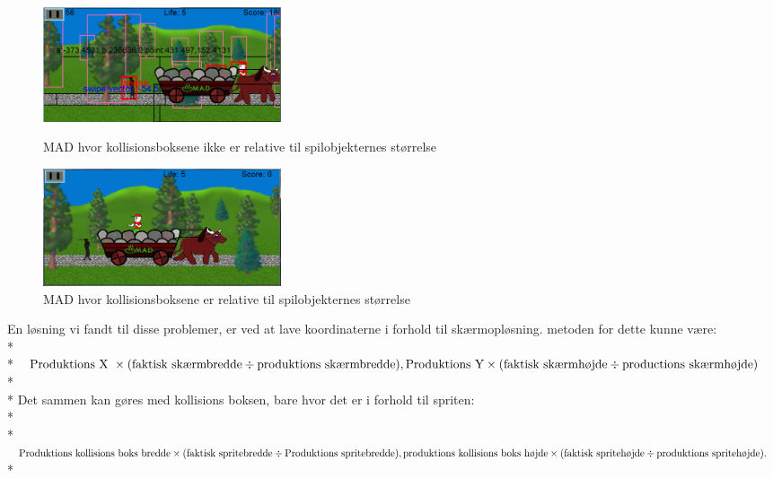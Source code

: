 \documentclass[Main.tex]{PositionOgSkalering}
\begin{document}
\begin{figure}[h]
\centering
\parbox{7cm}{   
\includegraphics[width = 7cm]{billeder/MADscaling5}
\caption{MAD hvor kollisionsboksene ikke er relative til spilobjekternes størrelse}    
\label{MADscaling5}}
\qquad
\begin{minipage}{7cm}
\includegraphics[width = 7cm]{billeder/MADscaling6}
\caption{MAD hvor kollisionsboksene er relative til spilobjekternes størrelse}    
\label{MADscaling6}
\end{minipage}
\end{figure}

En løsning vi fandt til disse problemer, er ved at lave koordinaterne i forhold til skærmopløsning. metoden for dette kunne være: \\*\\*
\begin{math}
\text{Produktions X } \times (\text{faktisk skærmbredde} \div \text{produktions skærmbredde}), \\*
\text{Produktions Y} \times (\text{faktisk skærmhøjde} \div \text{productions skærmhøjde})\end{math} \\* \\*
Det sammen kan gøres med kollisions boksen, bare hvor det er i forhold til spriten:\\*\\*
\begin{math}\text{Produktions kollisions boks bredde} \times (\text{faktisk spritebredde} \div \text{Produktions spritebredde}),\\*
\text{produktions kollisions boks højde} \times (\text{faktisk spritehøjde} \div \text{produktions spritehøjde}).  \end{math}\\*
\end{document}
